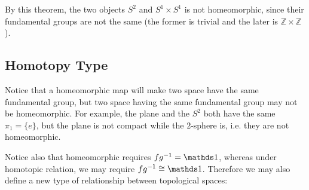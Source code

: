 \begin{fact}
By this theorem, the two objects $S^2$ and $S^1\times S^1$ is not
homeomorphic, since their fundamental groups are not the same (the
former is trivial and the later is $\mathbb{Z}\times\mathbb{Z}$).
\end{fact}


\subsection{Homotopy Type}
\label{sec:Homotopy-Type}

Notice that a homeomorphic map will make two space have the same
fundamental group, but two space having the same fundamental group may
not be homeomorphic. For example, the plane and the $S^2$ both have
the same $\pi_1=\{e\}$, but the plane is not compact while the
$2$-sphere is, i.e. they are not homeomorphic.

Notice also that homeomorphic requires $fg^{-1}=\id$, whereas under
homotopic relation, we may require $fg^{-1}\cong\id$. Therefore we may
also define a new type of relationship between topological spaces:

